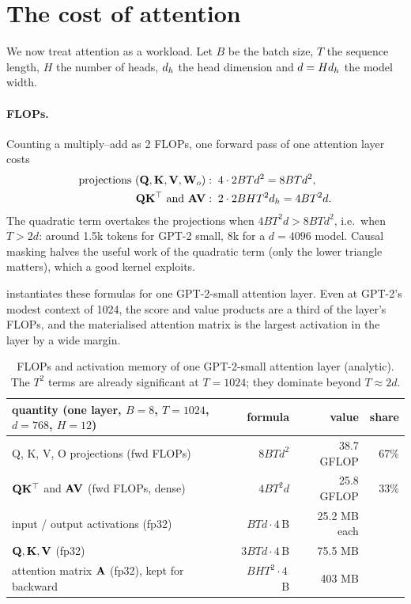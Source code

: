 \section{The cost of attention}\label{sec:attention:cost}

We now treat attention as a workload. Let $B$ be the batch size, $T$ the sequence length, $H$ the
number of heads, $d_{h}$ the head dimension and $d=Hd_{h}$ the model width.

\paragraph{FLOPs.} Counting a multiply--add as 2 FLOPs, one forward pass of one attention layer costs
\begin{align}
\text{projections } (\mathbf{Q},\mathbf{K},\mathbf{V},\mathbf{W}_o) &: \; 4\cdot 2BTd^2 = 8BTd^2,\\
\mathbf{Q}\mathbf{K}^\top \text{ and } \mathbf{A}\mathbf{V} &: \; 2\cdot 2BHT^2d_{h} = 4BT^2d .
\end{align}
The quadratic term overtakes the projections when $4BT^2d > 8BTd^2$, i.e.\ when $T>2d$: around
1.5k tokens for GPT-2 small, 8k for a $d=4096$ model. Causal masking halves the useful work of the
quadratic term (only the lower triangle matters), which a good kernel exploits.

 instantiates these formulas for one GPT-2-small attention layer. Even at
GPT-2's modest context of 1024, the score and value products are a third of the layer's FLOPs, and the
materialised attention matrix is the largest activation in the layer by a wide margin.

\begin{table}[t]
\centering\small
\begin{tabular}{@{}lrrr@{}}
\toprule
quantity (one layer, $B=8$, $T=1024$, $d=768$, $H=12$) & formula & value & share \\
\midrule
Q, K, V, O projections (fwd FLOPs) & $8BTd^2$ & 38.7 GFLOP & 67\% \\
$\mathbf{Q}\mathbf{K}^\top$ and $\mathbf{A}\mathbf{V}$ (fwd FLOPs, dense) & $4BT^2d$ & 25.8 GFLOP & 33\% \\
\midrule
input / output activations (fp32) & $BTd\cdot4$\,B & 25.2 MB each & \\
$\mathbf{Q},\mathbf{K},\mathbf{V}$ (fp32) & $3BTd\cdot4$\,B & 75.5 MB & \\
attention matrix $\mathbf{A}$ (fp32), kept for backward & $BHT^2\cdot4$\,B & 403 MB & \\
\bottomrule
\end{tabular}
\caption{FLOPs and activation memory of one GPT-2-small attention layer (analytic). The $T^2$ terms
are already significant at $T=1024$; they dominate beyond $T\approx2d$.}
\label{tab:attention:gpt2}
\end{table}

